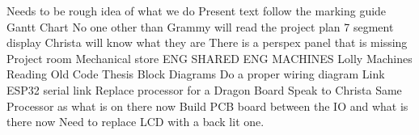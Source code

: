 Needs to be rough idea of what we do
Present text
follow the marking guide
	Gantt Chart
No one other than Grammy will read the project plan
7 segment display 
	Christa will know what they are
There is a perspex panel that is missing
	Project room
	Mechanical store
ENG SHARED
	ENG MACHINES
	Lolly Machines
	Reading
	Old Code
	Thesis
	Block Diagrams
	Do a proper wiring diagram
Link ESP32 serial link 
Replace processor for a Dragon Board
	Speak to Christa
	Same Processor as what is on there now
	Build PCB board between the IO and what is there now
Need to replace LCD with a back lit one.